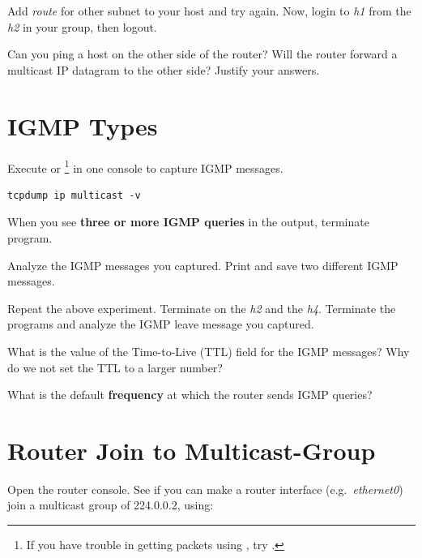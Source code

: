 \documentclass{../UTNetLab}
\begin{document}
Add \textit{route} for other subnet to your host and try  again.
Now, login to \textit{h1} from the \textit{h2} in your group, then logout.

\begin{report}
    \item Can you ping a host on the other side of the router?
    Will the router forward a multicast IP datagram to the other side?
    Justify your answers.
\end{report}

\section{IGMP Types}
Execute  or \footnote{If you have trouble in getting packets using , try .} in one console to capture IGMP messages.

\begin{lstlisting}[emph={eth0},morekeywords={[3]multicast}]
tcpdump ip multicast -v
\end{lstlisting}
When you see \textbf{three or more IGMP queries} in the  output, terminate  program.

Analyze the IGMP messages you captured.
Print and save two different IGMP messages.

Repeat the above experiment.
Terminate  on the \textit{h2} and the \textit{h4}.
Terminate the  programs and analyze the IGMP leave message you captured.

\begin{report}
    \item What is the value of the Time-to-Live (TTL) field for the IGMP messages?
    Why do we not set the TTL to a larger number?

    \item What is the default \textbf{frequency} at which the router sends IGMP queries?
\end{report}

\section{Router Join to Multicast-Group}
Open the router console.
See if you can make a router interface (e.g.\ \textit{ethernet0}) join a multicast group of 224.0.0.2, using:
\end{document}
